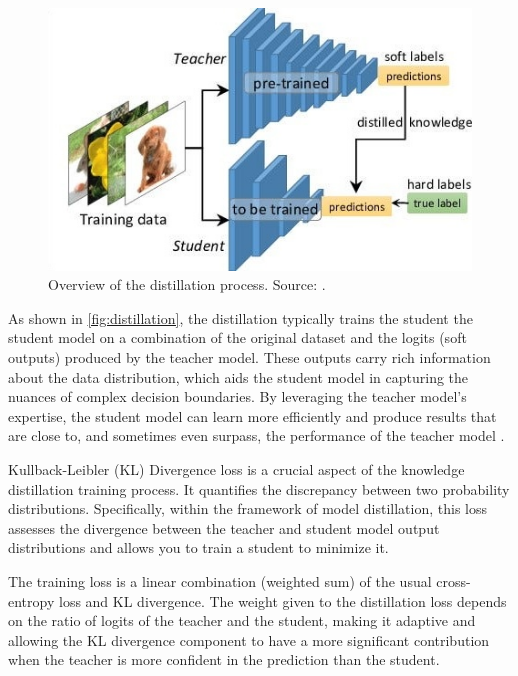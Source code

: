 \begin{figure}[hbt]
    \centering
    \includegraphics[width=0.7\linewidth]{figs/distillation.jpg}
    \caption[Overview of the distillation process]{Overview of the distillation process. Source: \cite{kd_simplified}.}
    \label{fig:distillation}
\end{figure}

As shown in \autoref{fig:distillation}, the distillation typically trains the student the student model on a combination of the original dataset and the logits (soft outputs) produced by the teacher model. These outputs carry rich information about the data distribution, which aids the student model in capturing the nuances of complex decision boundaries. By leveraging the teacher model's expertise, the student model can learn more efficiently and produce results that are close to, and sometimes even surpass, the performance of the teacher model \cite{distilling}.

Kullback-Leibler (KL) Divergence loss \cite{kl} is a crucial aspect of the knowledge distillation training process. It quantifies the discrepancy between two probability distributions. Specifically, within the framework of model distillation, this loss assesses the divergence between the teacher and student model output distributions and allows you to train a student to minimize it.

The training loss is a linear combination (weighted sum) of the usual cross-entropy loss and KL divergence. The weight given to the distillation loss depends on the ratio of logits of the teacher and the student, making it adaptive and allowing the KL divergence component to have a more significant contribution when the teacher is more confident in the prediction than the student.

